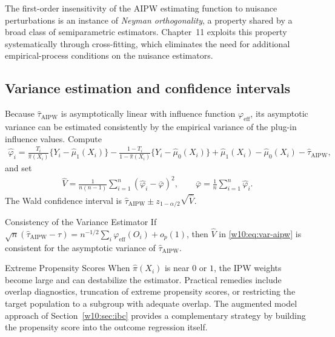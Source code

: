 \documentclass[master.tex]{subfiles}
\begin{document}
\begin{remark}
\label{w10:rem:neyman}
The first-order insensitivity of the AIPW estimating function to
nuisance perturbations is an instance of \emph{Neyman orthogonality},
a property shared by a broad class of semiparametric estimators.
Chapter~11 exploits this property systematically through
cross-fitting, which eliminates the need for additional
empirical-process conditions on the nuisance estimators.
\end{remark}

\subsection{Variance estimation and confidence intervals}
\label{w10:subsec:variance}

Because $\hat\tau_{\mathrm{AIPW}}$ is asymptotically linear with
influence function $\varphi_{\mathrm{eff}}$, its asymptotic variance
can be estimated consistently by the empirical variance of the
plug-in influence values.  Compute
\begin{align}
  \hat\varphi_i
  = \frac{T_i}{\hat\pi(X_i)}\{Y_i-\hat\mu_1(X_i)\}
    - \frac{1-T_i}{1-\hat\pi(X_i)}\{Y_i-\hat\mu_0(X_i)\}
    + \hat\mu_1(X_i)-\hat\mu_0(X_i)
    - \hat\tau_{\mathrm{AIPW}},
  \label{w10:eq:ifhat}
\end{align}
and set
\begin{align}
  \hat V
  = \frac{1}{n(n-1)}\sum_{i=1}^n(\hat\varphi_i-\bar\varphi)^2,
  \qquad
  \bar\varphi = \frac{1}{n}\sum_{i=1}^n\hat\varphi_i.
  \label{w10:eq:var-aipw}
\end{align}
The Wald confidence interval is
$\hat\tau_{\mathrm{AIPW}} \pm z_{1-\alpha/2}\sqrt{\hat V}$.

\begin{prop}{Consistency of the Variance Estimator}
\label{w10:prop:var-consistency}
If $\sqrt{n}(\hat\tau_{\mathrm{AIPW}}-\tau)
 = n^{-1/2}\sum_i\varphi_{\mathrm{eff}}(O_i)+o_p(1)$, then
$\hat V$ in \eqref{w10:eq:var-aipw} is consistent for the asymptotic
variance of $\hat\tau_{\mathrm{AIPW}}$.
\end{prop}

\begin{warn}{Extreme Propensity Scores}
\label{w10:warn:overlap}
When $\hat\pi(X_i)$ is near $0$ or $1$, the IPW weights become large
and can destabilize the estimator.  Practical remedies include overlap
diagnostics, truncation of extreme propensity scores, or restricting
the target population to a subgroup with adequate overlap.  The
augmented model approach of Section~\ref{w10:sec:ibc} provides a
complementary strategy by building the propensity score into the
outcome regression itself.
\end{warn}
\end{document}
